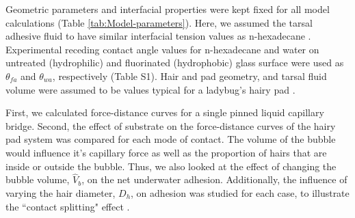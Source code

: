 \documentclass[vruler,JEB]{COB}%
\makeatletter
\newcommand{\lyxmathsym}[1]{\ifmmode\begingroup\def\b@ld{bold}
  \text{\ifx\math@version\b@ld\bfseries\fi#1}\endgroup\else#1\fi}
\providecommand{\tabularnewline}{\\}
\makeatother
\begin{document}
Geometric parameters and interfacial properties were kept fixed for
all model calculations (Table \ref{tab:Model-parameters}). Here,
we assumed the tarsal adhesive fluid to have similar interfacial tension values as n-hexadecane \citep{RN320}. Experimental receding contact angle values for n-hexadecane and water
on untreated (hydrophilic) and fluorinated (hydrophobic) glass surface were used as 
 $\theta_{fa}$ and $\theta_{wa}$, respectively (Table S1).
Hair and pad geometry, and tarsal fluid volume were assumed to be values typical
for a ladybug's hairy pad \citep{RN19, RN108}.

First, we calculated force-distance curves for a single pinned liquid
capillary bridge. Second, the effect of substrate on the force-distance
curves of the hairy pad system was compared for each mode of contact. The volume of the bubble would
influence it's capillary force as well as the proportion of hairs that are inside or outside the bubble.
Thus, we also looked at the effect of changing the bubble
volume, $\hat{V}_{b}$, on the net underwater adhesion.
Additionally, the influence of varying the hair diameter, $D_{h}$, on adhesion
was studied for each case, to illustrate the ``contact splitting" effect \citep{RN24}.

\end{document}

